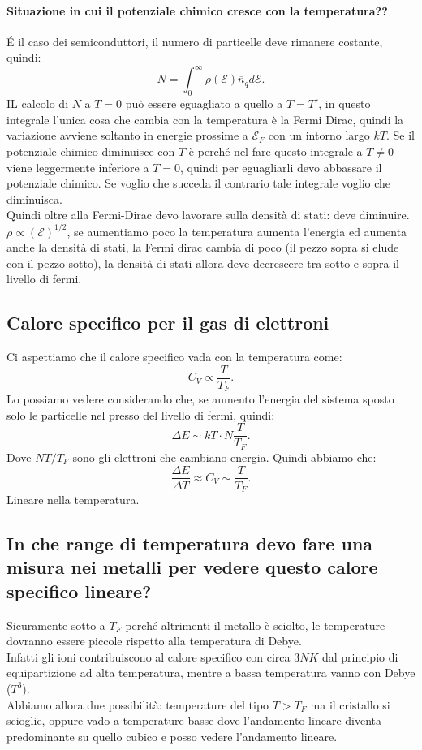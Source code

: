 \paragraph{Situazione in cui il potenziale chimico cresce con la temperatura??}%
\label{par:Situazione in cui il potenziale chimico cresce con la temperatura??}
É il caso dei semiconduttori, il numero di particelle deve rimanere costante, quindi:
\[
    N = \int_{0}^{\infty} \rho (\mathcal{E})\overline{n}_q d\mathcal{E} 
.\] 
IL calcolo di $N$ a $T=0$ può essere eguagliato a quello a $T = T'$, in questo integrale l'unica cosa che cambia con la temperatura è la Fermi Dirac, quindi la variazione avviene soltanto in energie prossime a $\mathcal{E}_F$ con un intorno largo $kT$. Se il potenziale chimico diminuisce con $T$ è perché nel fare questo integrale a $T\neq 0$ viene leggermente inferiore a $T=0$, quindi per eguagliarli devo abbassare il potenziale chimico. Se voglio che succeda il contrario tale integrale voglio che diminuisca.\\
Quindi oltre alla Fermi-Dirac devo lavorare sulla densità di stati: deve diminuire. $\rho  \propto  \left(\mathcal{E}\right)^{1 /2}$, se aumentiamo poco la temperatura aumenta l'energia ed aumenta anche la densità di stati, la Fermi dirac cambia di poco (il pezzo sopra si elude con il pezzo sotto), la densità di stati allora deve decrescere tra sotto e sopra il livello di fermi.
\subsection{Calore specifico per il gas di elettroni}%
\label{sub:Calore specifico per il gas di elettroni}
Ci aspettiamo che il calore specifico vada con la temperatura come:
\[
    C_V \propto  \frac{T}{T_F}
.\] 
Lo possiamo vedere considerando che, se aumento l'energia del sistema sposto solo le particelle nel presso del livello di fermi, quindi:
\[
    \Delta E \sim kT \cdot N\frac{T}{T_F}
.\] 
Dove $N T /T_F$ sono gli elettroni che cambiano energia.
Quindi abbiamo che:
\[
\frac{\Delta E}{\Delta T}  \approx  C_V \sim \frac{T}{T_F}
.\] 
Lineare nella temperatura.
\subsection{In che range di temperatura devo fare una misura nei metalli per vedere questo calore specifico lineare?}
Sicuramente sotto a $T_F$ perché altrimenti il metallo è sciolto, le temperature dovranno essere piccole rispetto alla temperatura di Debye.\\
Infatti gli ioni contribuiscono al calore specifico con circa $3NK$ dal principio di equipartizione ad alta temperatura, mentre a bassa temperatura vanno con Debye ($T^3$). \\
Abbiamo allora due possibilità: temperature del tipo $T>T_F$ ma il cristallo si scioglie, oppure vado a temperature basse dove l'andamento lineare diventa predominante su quello cubico e posso vedere l'andamento lineare.
